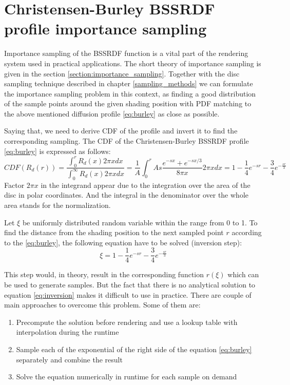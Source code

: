 \section{Christensen-Burley BSSRDF profile importance sampling}
\label{section:burley_importance}
Importance sampling of the BSSRDF function is a vital part of the rendering system used in practical
applications. The short theory of importance sampling is given in the section
\ref{section:importance_sampling}. Together with the disc sampling technique described in chapter
\ref{sampling_methods} we can formulate the importance sampling problem in this context, as finding
a good distribution of the sample points around the given shading position with \gls{PDF} matching
to the above mentioned diffusion profile \ref{eq:burley} as close as possible.

Saying that, we need to derive \gls{CDF} of the profile and invert it to find the corresponding
sampling.
The \gls{CDF} of the Christensen-Burley \gls{BSSRDF} profile \ref{eq:burley} is expressed as
follows:
\[
\label{eq:burley_cdf}
CDF(R_d(r)) = \frac{\int_{0}^{r} R_d(x)2\pi xdx}{\int_{0}^{\infty} R_d(x)2\pi xdx}  = \frac{1}{A}
\int_{0}^{r} As\frac{e^{-sx}+e^{-sx/3}}{8\pi x}2\pi xdx =
1-\frac{1}{4}e^{-sr}-\frac{3}{4}e^{-\frac{sr}{3}} \] Factor $2\pi x$ in the integrand appear due to
the integration over the area of the disc in polar coordinates. And the integral in the denominator
over the whole area stands for the normalization.

Let $\xi$ be uniformly distributed random variable within the range from 0 to 1. To find the
distance from the shading position to the next sampled point $r$ according to the \ref{eq:burley},
the following equation have to be solved (inversion step):
\begin{equation}
\label{eq:inversion}
\xi=1-\frac{1}{4}e^{-sr}-\frac{3}{4}e^{-\frac{sr}{3}}
\end{equation}

This step would, in theory, result in the corresponding function $r(\xi)$ which can be used to
generate samples. But the fact that there is no analytical solution to equation
\ref{eq:inversion} makes it difficult to use in practice.
There are couple of main approaches to overcome this problem. Some of them are:
\begin{enumerate}
  \item Precompute the solution before rendering and use a lookup table with interpolation
  during the runtime
  \item Sample each of the exponential of the right side of the equation \ref{eq:burley}
  separately and combine the result
  \item Solve the equation numerically in runtime for each sample on demand
\end{enumerate}


